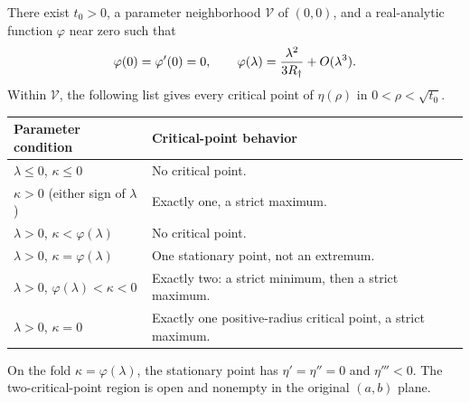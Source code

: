 \begin{theorem}
\label{rbif:thm:unfolding}
There exist $t_0>0$, a parameter neighborhood $\mathcal V$ of $(0,0)$,
and a real-analytic function $\varphi$ near zero such that
\begin{equation}
 \varphi(0)=\varphi'(0)=0,\qquad
 \varphi(\lambda)=\frac{\lambda^2}{3R_\dagger}+O(\lambda^3).
 \label{rbif:eq:fold}
\end{equation}
Within $\mathcal V$, the following list gives every critical point of
$\eta(\rho)$ in $0<\rho<\sqrt{t_0}$.
\begin{center}
\begin{tabular}{@{}p{}p{}@{}}
\toprule
Parameter condition & Critical-point behavior\\
\midrule
$\lambda\le0$, $\kappa\le0$ & No critical point.\\[1mm]
$\kappa>0$ (either sign of $\lambda$) & Exactly one, a strict maximum.\\[1mm]
$\lambda>0$, $\kappa<\varphi(\lambda)$ & No critical point.\\[1mm]
$\lambda>0$, $\kappa=\varphi(\lambda)$ & One stationary point, not an extremum.\\[1mm]
$\lambda>0$, $\varphi(\lambda)<\kappa<0$
 & Exactly two: a strict minimum, then a strict maximum.\\[1mm]
$\lambda>0$, $\kappa=0$ & Exactly one positive-radius critical point, a strict maximum.\\
\bottomrule
\end{tabular}
\end{center}
On the fold $\kappa=\varphi(\lambda)$, the stationary point has
$\eta'=\eta''=0$ and $\eta'''<0$. The two-critical-point region is open
and nonempty in the original $(a,b)$ plane.
\end{theorem}
